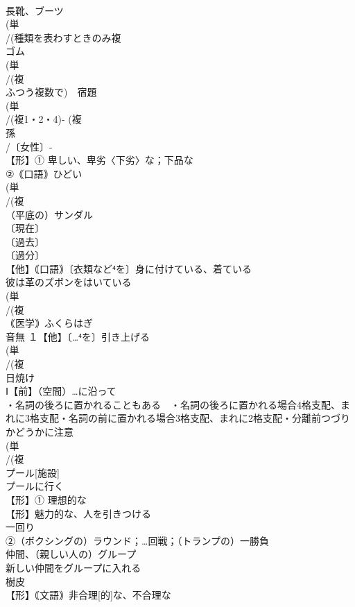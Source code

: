 \documentclass[8pt]{extreport}
\begin{document}
\begin{CJK}{UTF8}{min}
\\	長靴、ブーツ
\\	(単
\\	/(種類を表わすときのみ複
\\	ゴム 
\\	(単
\\	/(複
\\	ふつう複数で)　宿題 
\\	(単
\\	/(複1・2・4)- (複
\\	孫 
\\	/〔女性〕-
\\	【形】① 卑しい、卑劣〈下劣〉な；下品な 
\\	②｟口語｠ひどい
\\	(単
\\	/(複
\\	（平底の）サンダル 
\\	〔現在〕
\\	〔過去〕
\\	〔過分〕
\\	【他】｟口語｠〔衣類など⁴を〕身に付けている、着ている 
\\	彼は革のズボンをはいている 
\\	(単
\\	/(複
\\	｟医学｠ふくらはぎ 
\\	音無	１【他】〔…⁴を〕引き上げる 
\\	(単
\\	/(複
\\	日焼け 
\\	Ⅰ【前】（空間）…に沿って 
\\	・名詞の後ろに置かれることもある　・名詞の後ろに置かれる場合4格支配、まれに3格支配・名詞の前に置かれる場合3格支配、まれに2格支配・分離前つづりかどうかに注意
\\	(単
\\	/(複
\\	プール[施設] 
\\	プールに行く
\\	【形】① 理想的な
\\	【形】魅力的な、人を引きつける 
\\	一回り 
\\	②（ボクシングの）ラウンド；…回戦；（トランプの）一勝負 
\\	仲間、（親しい人の）グループ 
\\	新しい仲間をグループに入れる 
\\	樹皮
\\	【形】｟文語｠非合理[的]な、不合理な 

\end{CJK}
\end{document}
